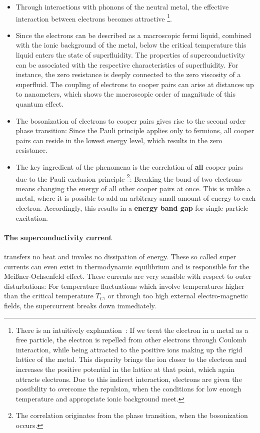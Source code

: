 \begin{itemize}
    \item Through interactions with phonons of the neutral metal, the effective interaction between electrons becomes attractive
    \footnote{There is an intuitively explanation~\cite{cooper1956bound}: If we treat the electron in a metal
    as a free particle, the electron is repelled from other electrons through Coulomb interaction, while
    being attracted to the positive ions making up the rigid lattice of the metal. This disparity 
    brings the ion closer to the electron and increases the positive potential in the lattice at that point, which again
    attracts electrons. Due to this indirect interaction, electrons are given the possibility to overcome the repulsion,
    when the conditions for low enough temperature and appropriate ionic background meet.
    }. 
    \item Since the electrons can be described as a macroscopic fermi liquid, combined with the ionic background of the metal, 
    below the critical temperature this liquid enters the state of superfluidity. The properties of superconductivity can be 
    associated with the respective characteristics of superfluidity. For instance, the zero resistance is deeply connected 
    to the zero viscosity of a superfluid. The coupling of electrons to cooper pairs can arise at distances up to nanometers,
    which shows the macroscopic order of magnitude of this quantum effect.
    \item The bosonization of electrons to cooper pairs gives rise to the second order phase transition: Since 
    the Pauli principle applies only to fermions, all cooper pairs can reside in the lowest energy level,
    which results in the zero resistance. 
    \item The key ingredient of the phenomena is the correlation of \textbf{all} cooper pairs due to the Pauli exclusion principle
    \footnote{The correlation originates from the phase transition, when the bosonization occurs.}:
    Breaking the bond of two electrons means changing the energy of all other cooper pairs at once. This is unlike a metal, where
    it is possible to add an arbitrary small amount of energy to each electron. Accordingly, this results 
    in a \textbf{energy band gap} for single-particle excitation.
\end{itemize}   
\paragraph{The superconductivity current} transfers no heat and involes
 no dissipation of energy. These
so called super currents can even exist in thermodynamic equilibrium and
is responsible for the Meißner-Ochsenfeld effect. These currents are very
sensible with respect to outer disturbations: For temperature fluctuations
which involve temperatures higher than the critical temperature $T_C$, 
or through too high external electro-magnetic fields, the supercurrent
breaks down immediately. 
